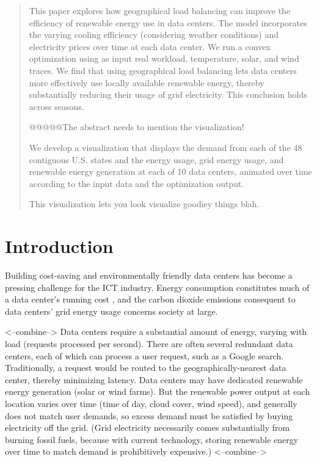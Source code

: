 \documentclass{acm_proc_article-sp}
\begin{document}
\maketitle
\begin{abstract}
This paper explores how geographical load balancing can improve the efficiency of renewable energy use in data centers.
The model incorporates the varying cooling efficiency (considering weather conditions) and electricity prices over time at each data center.
We run a convex optimization using as input real workload, temperature, solar, and wind traces.
We find that using geographical load balancing lets data centers more effectively use locally available renewable energy, thereby substantially reducing their usage of grid electricity. This conclusion holds across seasons.

@@@@@The abstract needs to mention the visualization!

We develop a visualization that displays the demand from each of the 48 contiguous U.S. states and the energy usage, grid energy usage, and renewable energy generation at each of 10 data centers, animated over time according to the input data and the optimization output.

This visualization lets you look visualize goodiey things blah.

\end{abstract}

\section{Introduction}
Building cost-saving and environmentally friendly data centers has become a pressing challenge for the ICT industry.
Energy consumption constitutes much of a data center’s running cost \cite{datacenter}, and the carbon dioxide emissions consequent to data centers’ grid energy usage concerns society at large.

<--combine-->
Data centers require a substantial amount of energy, varying with load (requests processed per second). There are often several redundant data centers, each of which can process a user request, such as a Google search. Traditionally, a request would be routed to the geographically-nearest data center, thereby minimizing latency. Data centers may have dedicated renewable energy generation (solar or wind farms). But the renewable power output at each location varies over time (time of day, cloud cover, wind speed), and generally does not match user demands, so excess demand must be satisfied by buying electricity off the grid. (Grid electricity necessarily comes substantially from burning fossil fuels, because with current technology, storing renewable energy over time to match demand is prohibitively expensive.)
<--combine-->
\end{document}
